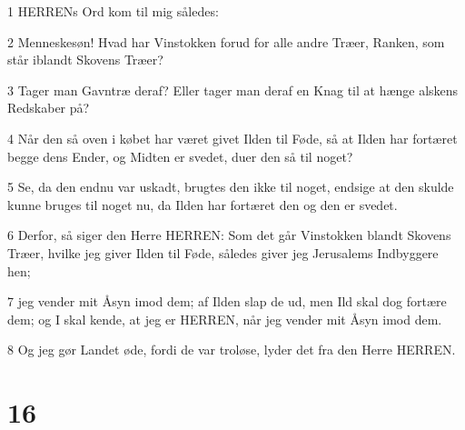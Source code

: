 \par 1 HERRENs Ord kom til mig således:
\par 2 Menneskesøn! Hvad har Vinstokken forud for alle andre Træer, Ranken, som står iblandt Skovens Træer?
\par 3 Tager man Gavntræ deraf? Eller tager man deraf en Knag til at hænge alskens Redskaber på?
\par 4 Når den så oven i købet har været givet Ilden til Føde, så at Ilden har fortæret begge dens Ender, og Midten er svedet, duer den så til noget?
\par 5 Se, da den endnu var uskadt, brugtes den ikke til noget, endsige at den skulde kunne bruges til noget nu, da Ilden har fortæret den og den er svedet.
\par 6 Derfor, så siger den Herre HERREN: Som det går Vinstokken blandt Skovens Træer, hvilke jeg giver Ilden til Føde, således giver jeg Jerusalems Indbyggere hen;
\par 7 jeg vender mit Åsyn imod dem; af Ilden slap de ud, men Ild skal dog fortære dem; og I skal kende, at jeg er HERREN, når jeg vender mit Åsyn imod dem.
\par 8 Og jeg gør Landet øde, fordi de var troløse, lyder det fra den Herre HERREN.

\chapter{16}

